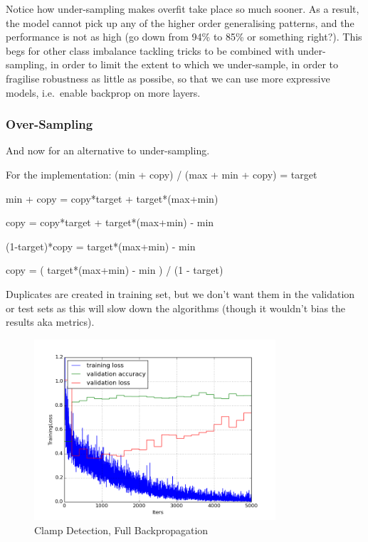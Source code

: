 \documentclass[a4paper,11pt]{article}
\begin{document}
Notice how under-sampling makes overfit take place so much sooner. As a result, the model cannot pick up any of the higher order generalising patterns, and the performance is not as high (go down from 94\% to 85\% or something right?). This begs for other class imbalance tackling tricks to be combined with under-sampling, in order to limit the extent to which we under-sample, in order to fragilise robustness as little as possibe, so that we can use more expressive models, i.e.\ enable backprop on more layers. \\



\subsubsection{Over-Sampling}

And now for an alternative to under-sampling. 

For the implementation: 
(min + copy) / (max + min + copy) = target

min + copy = copy*target + target*(max+min)

copy = copy*target + target*(max+min) - min

(1-target)*copy = target*(max+min) - min

copy = ( target*(max+min) - min ) / (1 - target)

Duplicates are created in training set, but we don't want them in the validation or test sets as this will slow down the algorithms (though it wouldn't bias the results aka metrics). 

\begin{figure}[h!]
	\centering
	\includegraphics[width=0.8\textwidth,natwidth=610,natheight=642]{images/plot_clampdet_us_none_reinit.png}
	\caption{Clamp Detection, Full Backpropagation}
\end{figure}
\end{document}
